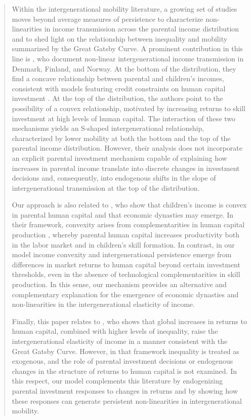 \documentclass[12pt]{article}
\begin{document}
\begin{abstract}
Within the intergenerational mobility literature, a growing set of studies moves beyond average measures of persistence to characterize non-linearities in income transmission across the parental income distribution and to shed light on the relationship between inequality and mobility summarized by the Great Gatsby Curve. A prominent contribution in this line is \textcite{Bratsberg_2007}, who document non-linear intergenerational income transmission in Denmark, Finland, and Norway. At the bottom of the distribution, they find a concave relationship between parental and children’s incomes, consistent with models featuring credit constraints on human capital investment \parencite{Becker_1986,Lochner_2011,Lochner_2020}. At the top of the distribution, the authors point to the possibility of a convex relationship, motivated by increasing returns to skill investment at high levels of human capital. The interaction of these two mechanisms yields an S-shaped intergenerational relationship, characterized by lower mobility at both the bottom and the top of the parental income distribution. However, their analysis does not incorporate an explicit parental investment mechanism capable of explaining how increases in parental income translate into discrete changes in investment decisions and, consequently, into endogenous shifts in the slope of intergenerational transmission at the top of the distribution.

Our approach is also related to \textcite{Becker_2018}, who show that children’s income is convex in parental human capital and that economic dynasties may emerge. In their framework, convexity arises from complementarities in human capital production \parencite{Cunha_2007}, whereby parental human capital increases productivity both in the labor market and in children’s skill formation. In contrast, in our model income convexity and intergenerational persistence emerge from differences in market returns to human capital beyond certain investment thresholds, even in the absence of technological complementarities in skill production. In this sense, our mechanism provides an alternative and complementary explanation for the emergence of economic dynasties and non-linearities in the intergenerational elasticity of income.

Finally, this paper relates to \textcite{Solon_2004}, who shows that global increases in returns to human capital, combined with higher levels of inequality, raise the intergenerational elasticity of income in a manner consistent with the Great Gatsby Curve. However, in that framework inequality is treated as exogenous, and the role of parental investment decisions or endogenous changes in the structure of returns to human capital is not examined. In this respect, our model complements this literature by endogenizing parental investment responses to changes in returns and by showing how these responses can generate persistent non-linearities in intergenerational mobility.




\end{abstract}
\end{document}
